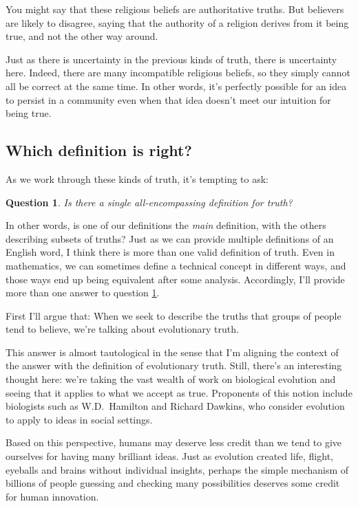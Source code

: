 \documentclass[11pt, oneside]{article}   	%
\newenvironment{answer}[1]
  {\renewcommand\theinnercustomthm{#1}\innercustomthm}
  {\endinnercustomthm}
\newtheorem{question}{Question}
\begin{document}
You might say that these religious beliefs are authoritative truths.
But believers are likely to disagree, saying that the authority of a
religion derives from it being true, and not the other way around.

Just as there is uncertainty in the previous kinds of truth, there is
uncertainty here.
Indeed, there are many incompatible religious beliefs, so they simply
cannot all be correct at the same time.
In other words, it's perfectly possible for an idea to persist in a community
even when that idea doesn't meet our intuition for being true.

\subsection{Which definition is right?}

As we work through these kinds of truth, it's tempting to ask:
\begin{question}\label{q3}
    Is there a single all-encompassing definition for truth?
\end{question}
In other words, is one of our definitions the {\em main} definition, with the
others describing subsets of truths?
Just as we can provide multiple definitions of an English word, I think there
is more than one valid definition of truth.
Even in mathematics, we can sometimes
define a technical concept in different ways, and those
ways end up being equivalent after some analysis.
Accordingly, I'll provide more than one answer to question \ref{q3}.

First I'll argue that:
\begin{answer}{3a.}
    When we seek to describe the truths that groups of people tend to believe,
    we're talking about evolutionary truth.
\end{answer}

This answer is almost tautological in the sense that I'm aligning the context of
the answer with the definition of evolutionary truth.
Still, there's
an interesting thought here: we're taking the vast wealth of work on
biological evolution and seeing that it applies to what we accept as true.
Proponents of this notion include
biologists such as W.D.~Hamilton and
Richard Dawkins, who consider evolution to apply to ideas in
social settings.

Based on this perspective, humans
may deserve less credit than we tend to give ourselves for having many
brilliant ideas. Just as evolution created life, flight, eyeballs and
brains without individual insights, perhaps the simple mechanism of billions of
people guessing and checking many possibilities deserves some
credit for human innovation.
\end{document}
